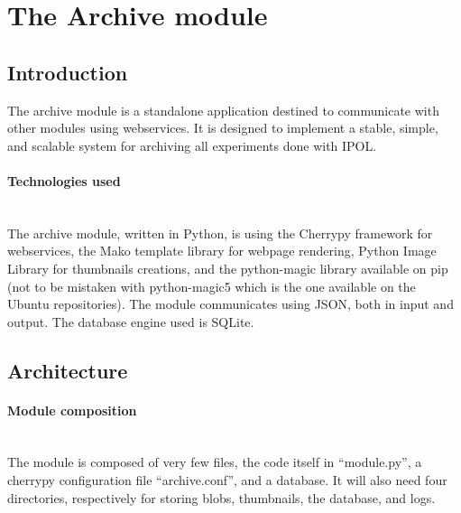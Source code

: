 \section{The Archive module}
\label{sec:archive}


\subsection{Introduction}
\label{sec:archive_introduction}

The archive module is a standalone application destined to communicate with other modules using webservices. It is designed to implement a stable, simple, and scalable system for archiving all experiments done with IPOL.

\paragraph{Technologies used} \hspace{0pt} \\
The archive module, written in Python, is using the Cherrypy framework for webservices, the Mako template library for webpage rendering, Python Image Library for thumbnails creations, and the python-magic library available on pip (not to be mistaken with python-magic5 which is the one available on the Ubuntu repositories). The module communicates using JSON, both in input and output. The database engine used is SQLite.

\subsection{Architecture}

\paragraph{Module composition} \hspace{0pt} \\
The module is composed of very few files, the code itself in ``module.py'', a cherrypy configuration file ``archive.conf'', and a database. It will also need four directories, respectively for storing blobs, thumbnails, the database, and logs.

